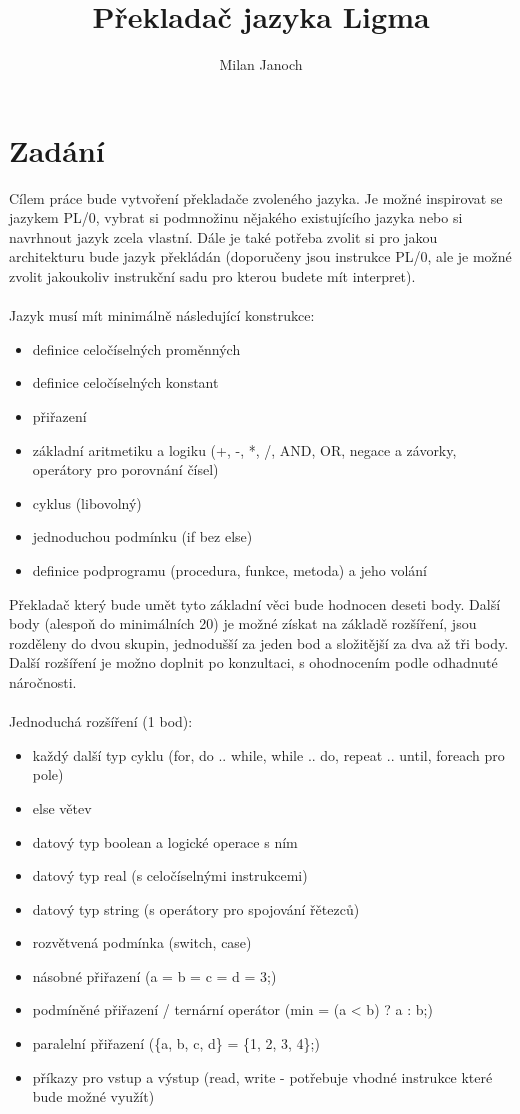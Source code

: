 \documentclass[czech, oth, kiv, he, iso690numb, viewonly]{fasthesis}
\title{Překladač jazyka Ligma}
\author{Milan Janoch}{a Jakub Pavlíček}{Bc.}{}
\begin{document}
\frontpages[tm]
\tableofcontents


\chapter{Zadání}
Cílem práce bude vytvoření překladače zvoleného jazyka. Je možné inspirovat se jazykem PL/0, vybrat si podmnožinu nějakého existujícího jazyka nebo si navrhnout jazyk zcela vlastní. Dále je také potřeba zvolit si pro jakou architekturu bude jazyk překládán (doporučeny jsou instrukce PL/0, ale je možné zvolit jakoukoliv instrukční sadu pro kterou budete mít interpret).
\\\\Jazyk musí mít minimálně následující konstrukce:
\begin{itemize}
    \item definice celočíselných proměnných
    \item definice celočíselných konstant
    \item přiřazení
    \item základní aritmetiku a logiku (+, -, *, /, AND, OR, negace a závorky, operátory pro porovnání čísel)
    \item cyklus (libovolný)
    \item jednoduchou podmínku (if bez else)
    \item definice podprogramu (procedura, funkce, metoda) a jeho volání
\end{itemize}
Překladač který bude umět tyto základní věci bude hodnocen deseti body. Další body (alespoň do minimálních 20) je možné získat na základě rozšíření, jsou rozděleny do dvou skupin, jednodušší za jeden bod a složitější za dva až tři body. Další rozšíření je možno doplnit po konzultaci, s ohodnocením podle odhadnuté náročnosti.
\\\\Jednoduchá rozšíření (1 bod):
\begin{itemize}
    \item každý další typ cyklu (for, do .. while, while .. do, repeat .. until, foreach pro pole)
    \item else větev
    \item datový typ boolean a logické operace s ním
    \item datový typ real (s celočíselnými instrukcemi)
    \item datový typ string (s operátory pro spojování řětezců)
    \item rozvětvená podmínka (switch, case)
    \item násobné přiřazení (a = b = c = d = 3;)
    \item podmíněné přiřazení / ternární operátor (min = (a < b) ? a : b;)
    \item paralelní přiřazení (\{a, b, c, d\} = \{1, 2, 3, 4\};)
    \item příkazy pro vstup a výstup (read, write - potřebuje vhodné instrukce které bude možné využít)
\end{itemize}
\end{document}
